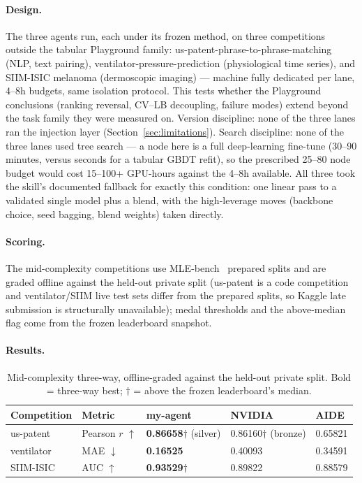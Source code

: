 \documentclass[11pt,a4paper]{article}
\newcommand{\dn}{\ensuremath{\downarrow}}
\newcommand{\up}{\ensuremath{\uparrow}}
\begin{document}
\paragraph{Design.} The three agents run, each under its frozen method, on three competitions outside the tabular Playground family: us-patent-phrase-to-phrase-matching (NLP, text pairing), ventilator-pressure-prediction (physiological time series), and SIIM-ISIC melanoma (dermoscopic imaging) --- machine fully dedicated per lane, 4--8h budgets, same isolation protocol. This tests whether the Playground conclusions (ranking reversal, CV--LB decoupling, failure modes) extend beyond the task family they were measured on. Version discipline: none of the three lanes ran the injection layer (Section~\ref{sec:limitations}). Search discipline: none of the three lanes used tree search --- a node here is a full deep-learning fine-tune (30--90 minutes, versus seconds for a tabular GBDT refit), so the prescribed 25--80 node budget would cost 15--100+ GPU-hours against the 4--8h available. All three took the skill's documented fallback for exactly this condition: one linear pass to a validated single model plus a blend, with the high-leverage moves (backbone choice, seed bagging, blend weights) taken directly.

\paragraph{Scoring.} The mid-complexity competitions use MLE-bench~\cite{mlebench} prepared splits and are graded offline against the held-out private split (us-patent is a code competition and ventilator/SIIM live test sets differ from the prepared splits, so Kaggle late submission is structurally unavailable); medal thresholds and the above-median flag come from the frozen leaderboard snapshot.

\paragraph{Results.}
\begin{table}[H]
\centering\small
\caption{Mid-complexity three-way, offline-graded against the held-out private split. Bold = three-way best; $\dagger$ = above the frozen leaderboard's median.}
\begin{tabular}{@{}lllll@{}}
\toprule
\textbf{Competition} & \textbf{Metric} & \textbf{my-agent} & \textbf{NVIDIA} & \textbf{AIDE} \\
\midrule
us-patent & Pearson $r$ \up & \textbf{0.86658}$\dagger$ (silver) & 0.86160$\dagger$ (bronze) & 0.65821 \\
ventilator & MAE \dn & \textbf{0.16525} & 0.40093 & 0.34591 \\
SIIM-ISIC & AUC \up & \textbf{0.93529}$\dagger$ & 0.89822 & 0.88579 \\
\bottomrule
\end{tabular}
\end{table}
\end{document}

